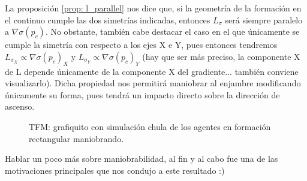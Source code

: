 La proposición \ref{prop: l_parallel} nos dice que, si la geometría de la formación en el continuo cumple las dos simetrías indicadas, entonces $L_\sigma$ será siempre paralelo a $\nabla\sigma(p_c)$. No obstante, también cabe destacar el caso en el que únicamente se cumple la simetría con respecto a los ejes X e Y, pues entonces tendremos {\color{red}$L_{\sigma_X} \propto \nabla\sigma(p_c)_X$ y $L_{\sigma_Y} \propto \nabla\sigma(p_c)_Y$ (hay que ser más preciso, la componente X de L depende únicamente de la componente X del gradiente... también conviene visualizarlo)}. Dicha propiedad nos permitirá maniobrar al enjambre modificando únicamente su forma, pues tendrá un impacto directo sobre la dirección de ascenso. 

\begin{figure}[!h]
    \centering
    \caption{\color{red}TFM: grafiquito con simulación chula de los agentes en formación rectangular maniobrando.}
    \label{fig: label}
\end{figure}

{\color{red} Hablar un poco más sobre maniobrabilidad, al fin y al cabo fue una de las motivaciones principales que nos condujo a este resultado :)}